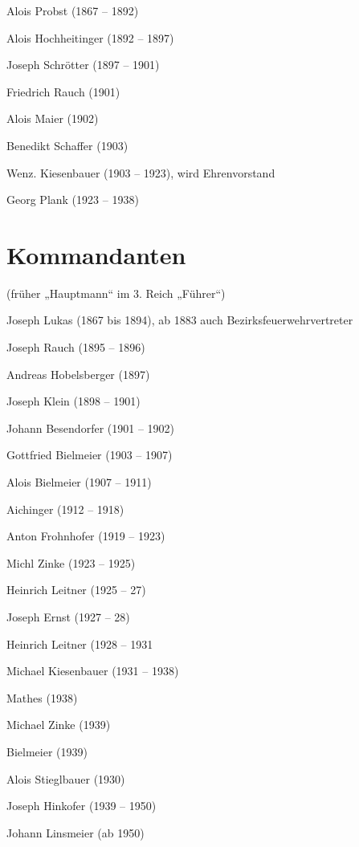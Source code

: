 \documentclass[12pt,a4paper]{book}
\begin{document}
\begin{compactitem}
\item Alois Probst (1867 – 1892)
\item Alois Hochheitinger (1892 – 1897)
\item Joseph Schrötter (1897 – 1901)
\item Friedrich Rauch (1901)
\item Alois Maier (1902)
\item Benedikt Schaffer (1903)
\item Wenz. Kiesenbauer (1903 – 1923), wird Ehrenvorstand
\item Georg Plank (1923 – 1938)
\end{compactitem}

\section*{Kommandanten}

(früher „Hauptmann“ im 3. Reich „Führer“)

\begin{compactitem}
\item Joseph Lukas (1867 bis 1894), ab 1883 auch
Bezirksfeuerwehrvertreter
\item Joseph Rauch (1895 – 1896)
\item Andreas Hobelsberger (1897)
\item Joseph Klein (1898 – 1901)
\item Johann Besendorfer (1901 – 1902)
\item Gottfried Bielmeier (1903 – 1907)
\item Alois Bielmeier (1907 – 1911)
\item Aichinger (1912 – 1918)
\item Anton Frohnhofer (1919 – 1923)
\item Michl Zinke (1923 – 1925)
\item Heinrich Leitner (1925 – 27)
\item Joseph Ernst (1927 – 28)
\item Heinrich Leitner (1928 – 1931
\item Michael Kiesenbauer (1931 – 1938)
\item Mathes (1938)
\item Michael Zinke (1939)
\item Bielmeier (1939)
\item Alois Stieglbauer (1930)
\item Joseph Hinkofer (1939 – 1950)
\item Johann Linsmeier (ab 1950)
\end{compactitem}
\end{document}
